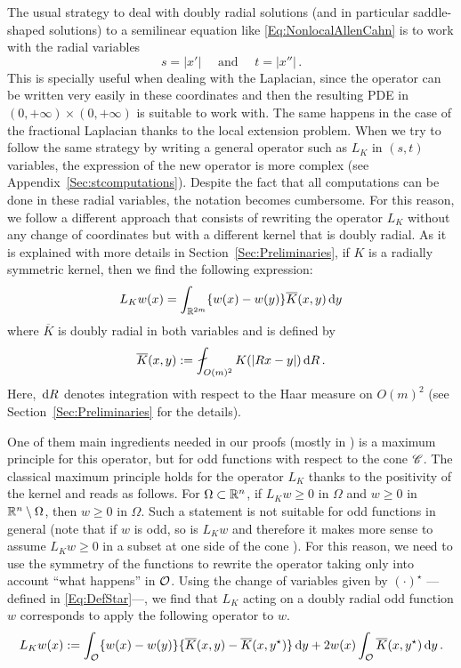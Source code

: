 The usual strategy to deal with doubly radial solutions (and in particular saddle-shaped solutions) to a semilinear equation like \eqref{Eq:NonlocalAllenCahn} is to work with the radial variables 
$$
s = |x'| \quad \text{ and } \quad t=|x''|\,.
$$
This is specially useful when dealing with the Laplacian, since the operator can be written very easily in these coordinates and then the resulting PDE in $(0,+\infty)\times (0,+\infty)$ is suitable to work with. The same happens in the case of the fractional Laplacian thanks to the local extension problem. When we try to follow the same strategy by writing a general operator such as $L_K$ in $(s,t)$ variables, the expression of the new operator is more complex (see Appendix~\ref{Sec:stcomputations}). Despite the fact that all computations can be done in these radial variables, the notation becomes cumbersome. For this reason, we follow a different approach that consists of rewriting the operator $L_K$ without any change of coordinates but with a different kernel that is doubly radial. As it is explained with more details in Section~\ref{Sec:Preliminaries}, if $K$ is a radially symmetric kernel, then we find the following expression:
$$
L_K w(x) = \int_{\mathbb{R}^{2m}} \{w(x) - w(y)\} \overline{K}(x,y) \,\mathrm{d} y
$$
where $\overline{K}$ is doubly radial in both variables and is defined by
\begin{equation}
\label{Eq:KbarDef'}
\overline{K}(x,y) := \average_{O(m)^2} K(|Rx - y|)\d R\,.
\end{equation}
Here, $\,\mathrm{d} R$ denotes integration with respect to the Haar measure on $O(m)^2$ (see Section~\ref{Sec:Preliminaries} for the details).


One of them main ingredients needed in our proofs (mostly in \cite{FelipeSanz-Perela:IntegroDifferentialII}) is a maximum principle for this operator, but for odd functions with respect to the cone $\mathscr{C}$. The classical maximum principle holds for the operator $L_K$ thanks to the positivity of the kernel and reads as follows. For $\Omega \subset \mathbb{R}^n$, if $L_K w \geq 0$ in $\Omega$ and $w \geq 0$ in $\mathbb{R}^n \setminus \Omega$, then $w\geq 0$ in $\Omega$. Such a statement is not suitable for odd functions in general (note that if $w$ is odd, so is $L_K w$ and therefore it makes more sense to assume $L_K w \geq 0$ in a subset  at one side of the cone ). For this reason, we need to use the symmetry of the functions to rewrite the operator taking only into account ``what happens'' in $\mathcal{O}$. Using the change of variables given by $(\cdot)^\star$ ---defined in \eqref{Eq:DefStar}---, we find that $L_K$ acting on a doubly radial odd function $w$ corresponds to apply the following operator to $w$. 
\begin{equation}
\label{Eq:OperatorOddF}
L_K w (x) := \int_{\mathcal{O}} \{w(x) - w(y) \} \{\overline{K}(x, y) - \overline{K}(x, y^\star)  \} \,\mathrm{d} y +  2 w(x) \int_{\mathcal{O}} \overline{K}(x, y^\star) \,\mathrm{d} y \,.
\end{equation}


